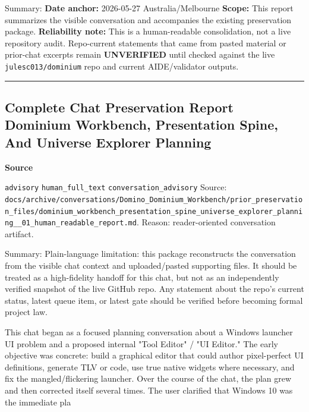 \documentclass[9pt,a4paper,openany]{book}
\newcommand{\vonecallout}[3]{\par\medskip\noindent\begingroup\setlength{\fboxsep}{7pt}\colorbox{DomCalloutBg}{\parbox{0.94\linewidth}{\textbf{\textcolor{#1}{#2}}\par #3}}\endgroup\par\medskip}
\begin{document}
Summary: \textbf{Date anchor:} 2026-\allowbreak{}05-\allowbreak{}27 Australia/\allowbreak{}Melbourne \textbf{Scope:} This report summarizes the visible conversation and accompanies the existing preservation package.\allowbreak{} \textbf{Reliability note:} This is a human-\allowbreak{}readable consolidation, not a live repository audit.\allowbreak{} Repo-\allowbreak{}current statements that came from pasted material or prior-\allowbreak{}chat excerpts remain \textbf{UNVERIFIED} until checked against the live \texttt{julesc013/\allowbreak{}dominium} repo and current AIDE/\allowbreak{}validator outputs.\allowbreak{}


\par\medskip\hrule\medskip


\subsection{Complete Chat Preservation Report Dominium Workbench, Presentation Spine, And Universe Explorer Planning}

\vonecallout{DomSlate}{Source}{\texttt{advisory} \texttt{human\_\allowbreak{}full\_\allowbreak{}text} \texttt{conversation\_\allowbreak{}advisory} Source: \texttt{docs/\allowbreak{}archive/\allowbreak{}conversations/\allowbreak{}Domino\_\allowbreak{}Dominium\_\allowbreak{}Workbench/\allowbreak{}prior\_\allowbreak{}preservation\_\allowbreak{}files/\allowbreak{}dominium\_\allowbreak{}workbench\_\allowbreak{}presentation\_\allowbreak{}spine\_\allowbreak{}universe\_\allowbreak{}explorer\_\allowbreak{}planning\_\allowbreak{}\_\allowbreak{}01\_\allowbreak{}human\_\allowbreak{}readable\_\allowbreak{}report.\allowbreak{}md}.\allowbreak{} Reason: reader-\allowbreak{}oriented conversation artifact.\allowbreak{}}

Summary: Plain-\allowbreak{}language limitation: this package reconstructs the conversation from the visible chat context and uploaded/\allowbreak{}pasted supporting files.\allowbreak{} It should be treated as a high-\allowbreak{}fidelity handoff for this chat, but not as an independently verified snapshot of the live GitHub repo.\allowbreak{} Any statement about the repo's current status, latest queue item, or latest gate should be verified before becoming formal project law.\allowbreak{}


This chat began as a focused planning conversation about a Windows launcher UI problem and a proposed internal "Tool Editor" /\allowbreak{} "UI Editor.\allowbreak{}" The early objective was concrete: build a graphical editor that could author pixel-\allowbreak{}perfect UI definitions, generate TLV or code, use true native widgets where necessary, and fix the mangled/\allowbreak{}flickering launcher.\allowbreak{} Over the course of the chat, the plan grew and then corrected itself several times.\allowbreak{} The user clarified that Windows 10 was the immediate pla
\end{document}
